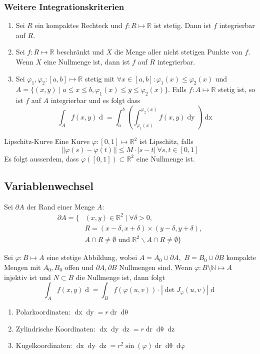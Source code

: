 \documentclass[a4paper,10pt]{article}
\def\R{\mathbb{R}}
\def\N{\mathbb{N}}
\begin{document}
\subsubsection*{Weitere Integrationskriterien}
\begin{enumerate}
  \item Sei \(R\) ein kompaktes Rechteck und \(f: R \mapsto \R\) ist stetig. Dann ist \(f\) integrierbar auf \(R\).
  \item Sei \(f: R \mapsto \R\) beschränkt und \(X\) die Menge aller nicht stetigen Punkte von \(f\). Wenn \(X\) eine Nullmenge ist, dann ist \(f\) auf \(R\) integrierbar.
  \item Sei \(\varphi_1, \varphi_2: \left[a,b\right]\mapsto \R\) stetig mit \(\forall x \in \left[a,b\right]: \varphi_1(x) \le \varphi_2(x)\) und \(A = \{(x,y)\mid a\le x \le b, \varphi_1(x) \le y \le \varphi_2(x)\}\). Falls \(f: A \mapsto \R\) stetig ist, so ist \(f\) auf \(A\) integrierbar und es folgt dass
  \[\int_A f(x,y) \mathop{d(x,y)} = \int_a^b \left(\int_{\varphi_1(x)}^{\varphi_2(x)} f(x,y) \mathop{dy}\right) \mathop{dx}\]
\end{enumerate}

\begin{subbox}{Lipschitz-Kurve}
  Eine Kurve \(\varphi : \left[0, 1\right] \mapsto \R^2\) ist Lipschitz, falls
  \[||\varphi(s) - \varphi(t)|| \le M \cdot |s-t| \ \forall s,t \in \left[0,1\right]\]
  Es folgt ausserdem, dass \(\varphi(\left[0,1\right]) \subset \R^2\) eine Nullmenge ist.
\end{subbox}

\subsection{Variablenwechsel}
Sei \(\partial A\) der Rand einer Menge \(A\):
\begin{align*}
    \partial A = \Big\{ &(x,y) \in \R^2 \mid \forall \delta > 0, \\ &R = (x - \delta, x + \delta) \times (y - \delta, y + \delta), \\
    &A \cap R \neq \emptyset \text{ und } \R^2 \backslash A \cap R \neq \emptyset \Big\}
\end{align*}

Sei \(\varphi : B \mapsto A\) eine stetige Abbildung, wobei \(A= A_0 \cup \partial A, \) \(B = B_0 \cup \partial B\) kompakte Mengen mit \(A_0, B_0\) offen und \(\partial A, \partial B\) Nullmengen sind. Wenn \(\varphi : B \setminus \N \mapsto A\) injektiv ist und \(N \subset B\) die Nullmenge ist, dann folgt
\[\int_A f(x,y) \mathop{d(x,y)} = \int_B f(\varphi(u,v)) \cdot \left|\det J_\varphi (u,v)\right| \mathop{d(u,v)}\]
\begin{enumerate}
  \item Polarkoordinaten: \(\mathop{dx}\mathop{dy} = r \mathop{dr} \mathop{d\theta}\)
  \item Zylindrische Koordinaten: \(\mathop{dx} \mathop{dy} \mathop{dz} = r \mathop{dr} \mathop{d\theta} \mathop{dz}\)
  \item Kugelkoordinaten: \(\mathop{dx}\mathop{dy}\mathop{dz} = r^2 \sin(\varphi) \mathop{dr} \mathop{d\theta} \mathop{d\varphi}\)
\end{enumerate}
\end{document}
